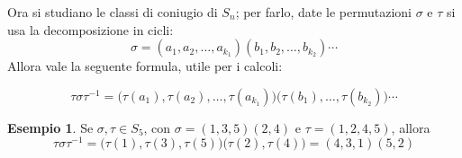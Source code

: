 \documentclass[11pt, a4paper]{scrartcl}
\theoremstyle{definition}
\newtheorem{esempio}{Esempio}
\numberwithin{esempio}{section}
\theoremstyle{definition}
\numberwithin{obs}{section}
\numberwithin{nota}{section}
\newenvironment{boxenv}[1][]{
    \begin{eqbox}[#1]
    }{
   \end{eqbox}
}
\numberwithin{equation}{subsection}
\begin{document}
	Ora si studiano le classi di coniugio di $S_n$; per farlo, date le permutazioni $\sigma $ e $\tau $ si usa la decomposizione in cicli:
	\[
	\sigma = (a_1, a_2, \ldots, a_{k_1} )( b_1, b_2,\ldots, b_{k_2} ) \cdots
	\] 
	Allora vale la seguente formula, utile per i calcoli:
	\begin{boxenv}[]
	\begin{equation}
		\tau \sigma \tau ^{-1} = \big(\tau (a_1), \tau (a_2),\ldots, \tau (a_{k_1} )\big)\big(\tau (b_1),\ldots,\tau(b _{k_2} )\big) \cdots
	\end{equation}
	\end{boxenv}
	\begin{esempio}
	Se $\sigma ,\tau  \in S_5$, con $\sigma  = (1,3,5)(2,4)$ e $\tau  = (1,2,4,5)$, allora
	\[
	\tau \sigma \tau ^{-1} = \big(\tau (1), \tau (3), \tau (5)\big)\big(\tau (2),\tau (4)\big)= (4,3,1)(5,2)
	\] 
	
	\end{esempio}
\end{document}
